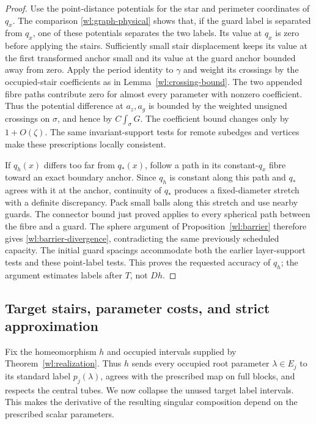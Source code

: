 \begin{proof}
Use the point-distance potentials for the star and perimeter
coordinates of $q_x$.  The comparison
\eqref{wl:graph-physical} shows that, if the guard label is separated
from $q_x$, one of these potentials separates the two labels.
Its value at $q_x$ is zero before applying the stairs.  Sufficiently
small stair displacement keeps its value at the first transformed
anchor small and its value at the guard anchor bounded away from
zero.  Apply the period identity to $\gamma$ and weight its crossings by
the occupied-stair coefficients as in
Lemma~\ref{wl:crossing-bound}.  The two appended fibre paths contribute
zero for almost every parameter with nonzero coefficient.  Thus the
potential difference at $a_z,a_g$ is bounded by the weighted unsigned
crossings on $\sigma$, and hence by $C\int_\sigma G$.
The coefficient bound changes only by $1+O(\zeta)$.
The same invariant-support tests for remote subedges and vertices
make these prescriptions locally consistent.

If $q_h(x)$ differs too far from $q_*(x)$, follow a path in its
constant-$q_x$ fibre toward an exact boundary anchor.  Since $q_h$
is constant along this path and
$q_*$ agrees with it at the anchor, continuity of $q_*$ produces a
fixed-diameter stretch with a definite discrepancy.  Pack small
balls along this stretch and use nearby guards.  The connector
bound just proved applies to every spherical path between the fibre
and a guard.  The sphere argument of Proposition~\ref{wl:barrier}
therefore gives \eqref{wl:barrier-divergence}, contradicting the same
previously scheduled capacity.  The initial guard spacings accommodate
both the earlier layer-support tests and these point-label tests.
This proves the requested accuracy of $q_h$; the argument estimates
labels after $T$, not $Dh$.
\end{proof}

\subsection{Target stairs, parameter costs, and strict approximation}

Fix the homeomorphism $h$ and occupied intervals supplied by
Theorem~\ref{wl:realization}.  Thus $h$ sends every occupied root
parameter $\lambda\in E_j$ to its standard label $p_j(\lambda)$,
agrees with the prescribed map on full blocks, and respects the
central tubes.  We now collapse the unused target label intervals.
This makes the derivative of the resulting singular composition
depend on the prescribed scalar parameters.

